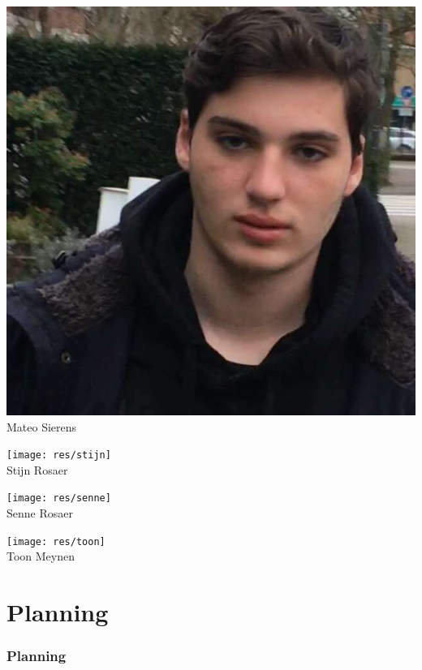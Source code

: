 \begin{frame}
\begin{minipage}{0.30\linewidth}
		\includegraphics[width=\linewidth]{res/mateo} \\%
        \footnotesize Mateo Sierens \strut%
    \end{minipage}
      	
    \begin{minipage}{0.30\linewidth}%
        \centering%
		\texttt{[image: res/stijn]} \\%
        \footnotesize Stijn Rosaer \strut%
    \end{minipage}
    \begin{minipage}{0.30\linewidth}%
        \centering%
		\texttt{[image: res/senne]} \\%
        \footnotesize Senne Rosaer \strut%
    \end{minipage}
    \begin{minipage}{0.30\linewidth}%
		\centering%
		\texttt{[image: res/toon]} \\%
		\footnotesize Toon Meynen \strut%
    \end{minipage}
\end{frame}  
   
    
\section{Planning}
\addtocounter{minutes}{3}
\begin{frame}
	\frametitle{Planning}
    

\end{frame}

